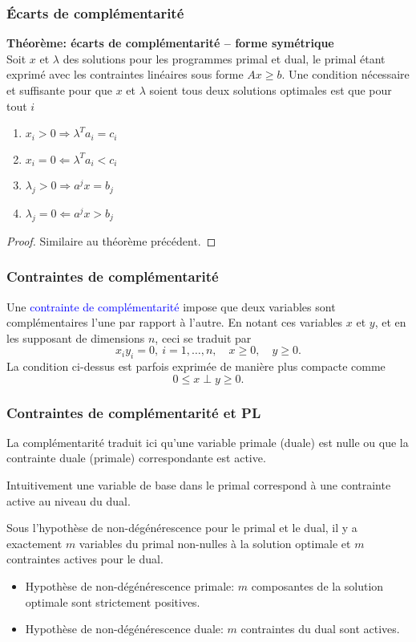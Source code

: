 \documentclass[usepdftitle=false]{beamer}
\begin{document}
\begin{frame}
	\frametitle{\'Ecarts de complémentarité}
	
	{\bf Théorème: écarts de complémentarité -- forme symétrique}\\
	Soit $x$ et $\lambda$ des solutions pour les programmes primal et dual, le primal étant exprimé avec les contraintes linéaires sous forme $Ax \geq b$. Une condition nécessaire et suffisante pour que $x$ et $\lambda$ soient tous deux solutions optimales est que pour tout $i$
	\begin{enumerate}
		\item
		$x_i > 0 \Rightarrow \lambda^T a_i = c_i$
		\item
		$x_i = 0 \Leftarrow \lambda^T a_i < c_i$
		\item
		$\lambda_j > 0 \Rightarrow a^j x = b_j$
		\item
		$\lambda_j = 0 \Leftarrow a^j x > b_j$
	\end{enumerate}
	
	\begin{proof}
		Similaire au théorème précédent.
	\end{proof}
	
\end{frame}

\begin{frame}
	\frametitle{Contraintes de complémentarité}
	
	Une \textcolor{blue}{contrainte de complémentarité} impose que deux variables sont complémentaires l'une par rapport à l'autre.
	En notant ces variables $x$ et $y$, et en les supposant de dimensions $n$, ceci se traduit par
	$$
	x_iy_i = 0,\ i = 1,\ldots,n, \quad x \ge 0, \quad y \ge 0.
	$$
	La condition ci-dessus est parfois exprimée de manière plus compacte comme
	$$
	0 \leq x \perp y \geq 0.
	$$
	
\end{frame}

\begin{frame}
	\frametitle{Contraintes de complémentarité et PL}
	
	La complémentarité traduit ici qu'une variable primale (duale) est nulle ou que la contrainte duale (primale) correspondante est active.
	
	\mbox{}
	
	Intuitivement une variable de base dans le primal correspond à une contrainte active au niveau du dual.
	
	\mbox{}
	
	Sous l'hypothèse de non-dégénérescence pour le primal et le dual, il y a exactement $m$ variables du primal non-nulles à la solution optimale et $m$ contraintes actives pour le dual.
	\begin{itemize}
		\item 
		Hypothèse de non-dégénérescence primale: $m$ composantes de la solution optimale sont strictement positives.
		\item 
		Hypothèse de non-dégénérescence duale: $m$ contraintes du dual sont actives.
	\end{itemize}
	
\end{frame}
\end{document}
